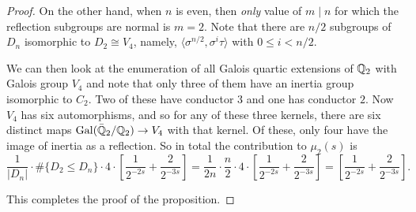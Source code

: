 \begin{proof}
On the other hand, when $n$ is even, then {\em only} value of $m \mid n$ for
which the reflection subgroups are normal is $m = 2$.  Note that there are
$n/2$ subgroups of $D_n$ isomorphic to $D_2 \cong V_4$, namely, $\langle
\sigma^{n/2}, \sigma^i\tau \rangle$ with $0 \leq i < n/2$.

We can then look at the enumeration of all Galois quartic extensions of $\mathbb{Q}_2$
with Galois group $V_4$ and note that only three of them have an inertia group
isomorphic to $C_2$. Two of these have conductor $3$ and one has conductor
$2$.  Now $V_4$ has six automorphisms, and so for any of these three kernels,
there are six distinct maps $\operatorname{Gal}(\Bar{\mathbb{Q}}_2/\mathbb{Q}_2) \to V_4$ with that kernel. Of
these, only four have the image of inertia as a reflection. So in total the
contribution to $\mu_2(s)$ is
\[ \frac{1}{|D_n|} \cdot \#\{ D_2 \leq D_n \} \cdot 4 \cdot
      \left[\frac{1}{2^{-2s}} + \frac{2}{2^{-3s}} \right]
  = \frac{1}{2n} \cdot \frac{n}{2} \cdot 4 \cdot \left[\frac{1}{2^{-2s}} + \frac{2}{2^{-3s}} \right]
  = \left[\frac{1}{2^{-2s}} + \frac{2}{2^{-3s}} \right]. \]

This completes the proof of the proposition.
\end{proof}
